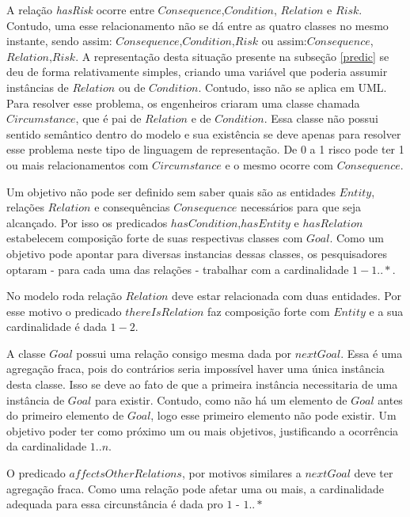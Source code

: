 A relação \textit{hasRisk} ocorre entre $Consequence$,$Condition$, $Relation$ e $Risk$. Contudo, uma esse relacionamento não se dá entre as quatro classes no mesmo instante, sendo assim: $Consequence$,$Condition$,$Risk$ ou assim:$Consequence$,$Relation$,$Risk$. A representação 
desta situação presente na subseção \ref{predic} se deu de forma relativamente simples, criando uma variável que poderia assumir instâncias de $Relation$ ou de $Condition$. Contudo, isso não se aplica em UML. Para resolver esse problema, os engenheiros criaram uma classe chamada $Circumstance$, que é pai de $Relation$ e de $Condition$. Essa classe não possui sentido semântico dentro do modelo e sua existência se deve apenas para resolver esse problema neste tipo de linguagem de representação. De 0 a 1 risco pode ter 1 ou mais relacionamentos com $Circumstance$ e o mesmo ocorre com $Consequence$. 

Um objetivo não pode ser definido sem saber quais são as entidades $Entity$, relações $Relation$ e consequências $Consequence$ necessários para que seja alcançado. Por isso os predicados $hasCondition$,$hasEntity$ e $hasRelation$ estabelecem composição forte de suas respectivas classes com $Goal$. Como um objetivo pode apontar para diversas instancias dessas classes, os pesquisadores optaram - para cada uma das relações - trabalhar com a cardinalidade 
$1 - 1 .. *$.

No modelo roda relação $Relation$ deve estar relacionada com duas entidades. Por esse motivo o predicado $thereIsRelation$ faz composição forte com $Entity$ e a sua cardinalidade é dada $1 - 2$. 

A classe $Goal$ possui uma relação consigo mesma dada por $nextGoal$. Essa é uma agregação fraca, pois do contrários seria impossível haver uma única instância desta classe. Isso se deve ao fato de que a primeira instância necessitaria de uma instância de $Goal$ para existir. Contudo, como não há um elemento de $Goal$ antes do primeiro elemento de $Goal$, logo esse primeiro elemento não pode existir. Um objetivo poder ter como próximo um ou mais objetivos, justificando a ocorrência da cardinalidade $1 .. n$. 

O predicado $affectsOtherRelations$, por motivos similares a $nextGoal$ deve ter agregação fraca. Como uma relação pode afetar uma ou mais, a cardinalidade adequada para essa circunstância é dada pro $1$ - $1 ..*$
